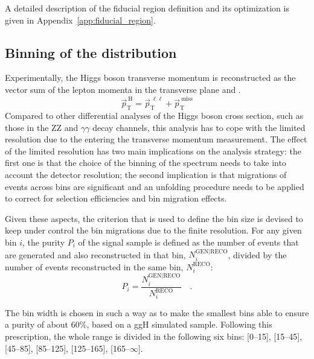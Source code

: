 A detailed description of the fiducial region definition and its optimization is given in Appendix~\ref{app:fiducial_region}.










\subsection{Binning of the \pth distribution}

Experimentally, the Higgs boson transverse momentum is reconstructed as the vector sum of the lepton momenta in the transverse plane and \ptmiss.
\begin{equation}
\vec{p}_\mathrm{T}^\mathrm{~H} = \vec{p}_\mathrm{T}^{~\ell\ell} + \vec{p}_\mathrm{T}^\mathrm{~miss}
\end{equation}
Compared to other differential analyses of the Higgs boson cross section, such as those in the ZZ and $\gamma\gamma$ decay channels, this analysis has to cope with the limited resolution due to the \MET entering the transverse momentum measurement.
The effect of the limited \MET resolution has two main implications on the analysis strategy: the first one is that the choice of the binning of the \pth{} spectrum needs to take into account the detector resolution; the second implication is that migrations of events across bins are significant and an unfolding procedure needs to be applied to correct for selection efficiencies and bin migration effects.

Given these aspects, the criterion that is used to define the \pth bin size is devised to keep under control the bin migrations due to the finite resolution.
For any given bin $i$, the purity $P_i$ of the signal sample is defined as the number of events that are generated and also reconstructed in that bin, $N_i^\mathrm{GEN|RECO}$, divided by the number of events reconstructed in the same bin, $N_i^\mathrm{RECO}$:
\begin{equation}\label{eq:purity}
P_i = \frac{N_i^\mathrm{GEN|RECO}}{N_i^\mathrm{RECO}} \quad .
\end{equation}

The bin width is chosen in such a way as to make the smallest bins able to ensure a purity of about 60\%, based on a ggH simulated sample.
Following this prescription, the whole \pth range is divided in the following six bins: \mbox{[0--15]\GeV}, \mbox{[15--45]\GeV}, \mbox{[45--85]\GeV}, \mbox{[85--125]\GeV}, \mbox{[125--165]\GeV}, \mbox{[165--$\infty$]\GeV}.

